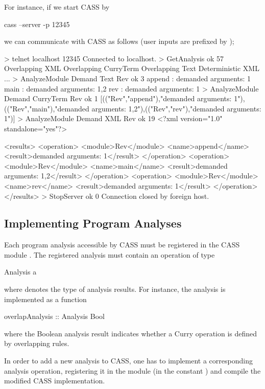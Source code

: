For instance, if we start CASS by
\begin{curry}
cass --server -p 12345
\end{curry}
we can communicate with CASS as follows (user inputs are prefixed by \ccode{>});
\begin{curry}
> telnet localhost 12345
Connected to localhost.
> GetAnalysis
ok 57
Overlapping XML
Overlapping CurryTerm
Overlapping Text
Deterministic XML
...
> AnalyzeModule Demand Text Rev
ok 3
append : demanded arguments: 1
main : demanded arguments: 1,2
rev : demanded arguments: 1
> AnalyzeModule Demand CurryTerm Rev
ok 1
[(("Rev","append"),"demanded arguments: 1"),(("Rev","main"),"demanded arguments: 1,2"),(("Rev","rev"),"demanded arguments: 1")]
> AnalyzeModule Demand XML Rev
ok 19
<?xml version="1.0" standalone="yes"?>

<results>
  <operation>
    <module>Rev</module>
    <name>append</name>
    <result>demanded arguments: 1</result>
  </operation>
  <operation>
    <module>Rev</module>
    <name>main</name>
    <result>demanded arguments: 1,2</result>
  </operation>
  <operation>
    <module>Rev</module>
    <name>rev</name>
    <result>demanded arguments: 1</result>
  </operation>
</results>
> StopServer
ok 0
Connection closed by foreign host.
\end{curry}


\subsection{Implementing Program Analyses}

Each program analysis accessible by CASS must be registered
in the CASS module . The registered analysis
must contain an operation of type
\begin{curry}
Analysis a
\end{curry}
where  denotes the type of analysis results.
For instance, the  analysis is implemented as a function
\begin{curry}
overlapAnalysis :: Analysis Bool
\end{curry}
where the Boolean analysis result indicates whether a Curry operation
is defined by overlapping rules.

In order to add a new analysis to CASS, one has to implement
a corresponding analysis operation, registering it in the module
 (in the constant )
and compile the modified CASS implementation.

